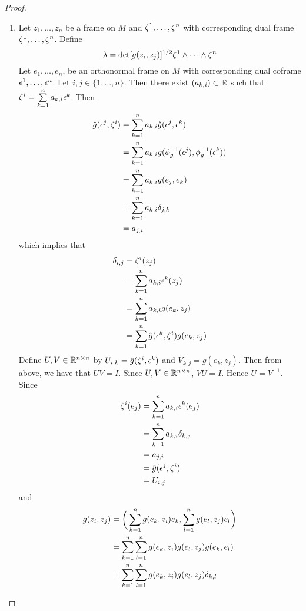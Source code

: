\documentclass{book}
\begin{document}
\begin{proof}\
	\begin{enumerate}
		\item Let $z_1, \ldots, z_n$ be a frame on $M$ and $\zeta^1, \ldots, \zeta^n$ with corresponding dual frame $\zeta^1, \ldots, \zeta^n$. Define 
		$$\lambda = \det [g(z_i, z_j)]^{1/2} \zeta^1 \wedge \cdots \wedge \zeta^n$$
		Let $e_1, \ldots, e_n$, be an orthonormal frame on $M$ with corresponding dual coframe $\epsilon^1, \ldots, \epsilon^n$. Let $i,j \in \{1, \ldots, n\}$. Then there exist $(a_{k,i}) \subset \mathbb{R}$ such that $\zeta^i = \sum\limits_{k=1}^n a_{k,i} \epsilon^k$.
		Then 
		\begin{align*}
			\hat{g}(\epsilon^j, \zeta^i)
			& = \sum\limits_{k=1}^n a_{k,i} \hat{g}(\epsilon^j, \epsilon^k) \\
			& = \sum\limits_{k=1}^n a_{k,i} g( \phi_g^{-1}(\epsilon^j), \phi_g^{-1}(\epsilon^k)) \\
			& = \sum\limits_{k=1}^n a_{k,i} g(e_j, e_k) \\
			& = \sum\limits_{k=1}^n a_{k,i} \delta_{j,k} \\
			& = a_{j,i}
		\end{align*}
		which implies that
		\begin{align*}
			\delta_{i,j}
			& = \zeta^i(z_j) \\
			& = \sum\limits_{k=1}^n a_{k,i} \epsilon^k(z_j) \\
			& = \sum\limits_{k=1}^n a_{k,i} g(e_k, z_j) \\
			& = \sum\limits_{k=1}^n \hat{g}(\epsilon^k, \zeta^i) g(e_k, z_j) 
		\end{align*}
		Define $U, V \in \mathbb{R}^{n \times n}$ by $U_{i,k} = \hat{g}(\zeta^i, \epsilon^k)$ and $V_{k,j} = g(e_k, z_j)$. Then from above, we have that $UV = I$. Since $U,V \in \mathbb{R}^{n \times n}$, $VU = I$. Hence $U = V^{-1}$. Since 
		\begin{align*}
			\zeta^i(e_j)
			& = \sum_{k=1}^n a_{k,i}\epsilon^k(e_j) \\
			& = \sum_{k=1}^n a_{k,i} \delta_{k, j} \\
			& = a_{j, i} \\
			& = \hat{g}(\epsilon^j, \zeta^i) \\
			& = U_{i,j}
		\end{align*}
		and 
		\begin{align*}
			g(z_i, z_j)
			& = \bigg( \sum_{k=1}^n g(e_k, z_i)e_k , \sum_{l=1}^n g(e_l, z_j) e_l \bigg) \\
			& = \sum_{k=1}^n \sum_{l=1}^n g(e_k, z_i) g(e_l, z_j) g(e_k, e_l) \\
			& = \sum_{k=1}^n \sum_{l=1}^n g(e_k, z_i) g(e_l, z_j) \del_{k,l} \\

\end{align*}
\end{enumerate}
\end{proof}
\end{document}
